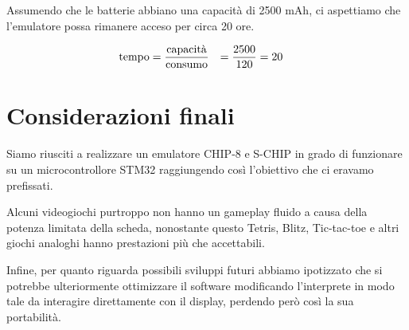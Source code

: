 \documentclass[a4paper]{article}
\begin{document}
Assumendo che le batterie abbiano una capacità di 2500 mAh, ci aspettiamo che
l'emulatore possa rimanere acceso per circa 20 ore.

\begin{equation*}
    \begin{aligned}
        \textmd{tempo} & = \frac{\textmd{capacità}}{\textmd{consumo}} & = \frac{2500}{120} & = 20
    \end{aligned}
\end{equation*}

\section{Considerazioni finali}

Siamo riusciti a realizzare un emulatore CHIP-8 e S-CHIP in grado di funzionare su un
microcontrollore STM32 raggiungendo così l'obiettivo che ci eravamo prefissati.

Alcuni videogiochi purtroppo non hanno un gameplay fluido a causa della potenza
limitata della scheda, nonostante questo Tetris, Blitz, Tic-tac-toe e altri giochi
analoghi hanno prestazioni più che accettabili.

Infine, per quanto riguarda possibili sviluppi futuri abbiamo ipotizzato che si potrebbe
ulteriormente ottimizzare il software modificando l'interprete in modo tale da interagire
direttamente con il display, perdendo però così la sua portabilità.

\clearpage



\end{document}
